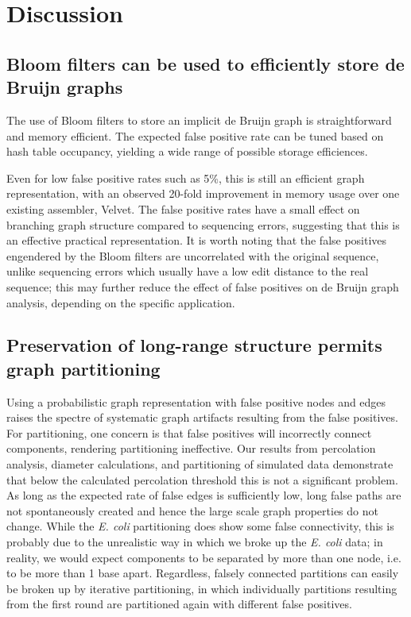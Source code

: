\documentclass[12pt]{article} \usepackage{simplemargins}
\begin{document}
\section{Discussion}

\subsection{Bloom filters can be used to efficiently store de Bruijn graphs}

The use of Bloom filters to store an implicit de Bruijn graph is
straightforward and memory efficient.  The expected false positive
rate can be tuned based on hash table occupancy, yielding a wide range
of possible storage efficiences.

Even for low false positive rates such as 5\%, this is still an
efficient graph representation, with an observed 20-fold improvement
in memory usage over one existing assembler, Velvet.  The false
positive rates have a small effect on branching graph structure
compared to sequencing errors, suggesting that this is an effective
practical representation.  It is worth noting that the false positives
engendered by the Bloom filters are uncorrelated with the original
sequence, unlike sequencing errors which usually have a low edit
distance to the real sequence; this may further reduce the effect of
false positives on de Bruijn graph analysis, depending on the specific
application.

\subsection{Preservation of long-range structure permits graph partitioning}

Using a probabilistic graph representation with false positive nodes
and edges raises the spectre of systematic graph artifacts resulting
from the false positives.  For partitioning, one concern is that false
positives will incorrectly connect components, rendering partitioning
ineffective.  Our results from percolation analysis, diameter
calculations, and partitioning of simulated data demonstrate that
below the calculated percolation threshold this is not a significant
problem.  As long as the expected rate of false edges is sufficiently
low, long false paths are not spontaneously created and hence the
large scale graph properties do not change.  While the \emph{E. coli}
partitioning does show some false connectivity, this is probably due
to the unrealistic way in which we broke up the \emph{E. coli} data;
in reality, we would expect components to be separated by more than
one node, i.e. to be more than 1 base apart.  Regardless, falsely
connected partitions can easily be broken up by iterative
partitioning, in which individually partitions resulting from the first round are
partitioned again with different false positives.
\end{document}
